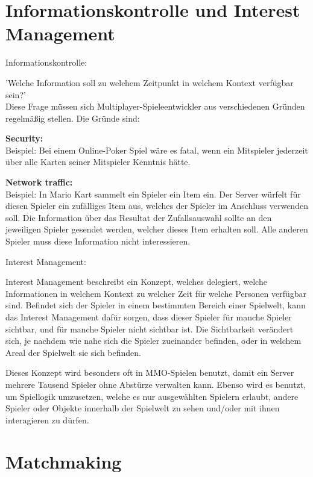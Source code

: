 \section{Informationskontrolle und Interest Management}

\textsf{\Large Informationskontrolle:}

'Welche Information soll zu welchem Zeitpunkt in welchem Kontext verfügbar sein?' \\
Diese Frage müssen sich Multiplayer-Spieleentwickler aus verschiedenen Gründen regelmäßig stellen. Die Gründe sind:

\textbf{Security:} \\
Beispiel: Bei einem Online-Poker Spiel wäre es fatal, wenn ein Mitspieler jederzeit über alle Karten seiner Mitspieler Kenntnis hätte. 

\textbf{Network traffic:} \\
Beispiel: In Mario Kart sammelt ein Spieler ein Item ein. Der Server würfelt für diesen Spieler ein zufälliges Item aus, welches der Spieler im Anschluss verwenden soll. Die Information über das Resultat der Zufallsauswahl sollte an den jeweiligen Spieler gesendet werden, welcher dieses Item erhalten soll. Alle anderen Spieler muss diese Information nicht interessieren.
 
\textsf{\Large Interest Management:}
\label{interest_management}

Interest Management beschreibt ein Konzept, welches delegiert, welche Informationen in welchem Kontext zu welcher Zeit für welche Personen verfügbar sind. Befindet sich der Spieler in einem bestimmten Bereich einer Spielwelt, kann das Interest Management dafür sorgen, dass dieser Spieler für manche Spieler sichtbar, und für manche Spieler nicht sichtbar ist. Die Sichtbarkeit verändert sich, je nachdem wie nahe sich die Spieler zueinander befinden, oder in welchem Areal der Spielwelt sie sich befinden.

Dieses Konzept wird besonders oft in MMO-Spielen \cite{Wikipedia.2021i} benutzt, damit ein Server mehrere Tausend Spieler ohne Abstürze verwalten kann. Ebenso wird es benutzt, um Spiellogik umzusetzen, welche es nur ausgewählten Spielern erlaubt, andere Spieler oder Objekte innerhalb der Spielwelt zu sehen und/oder mit ihnen interagieren zu dürfen.

\cite{Smed.2002c}

\newpage

\section{Matchmaking}

